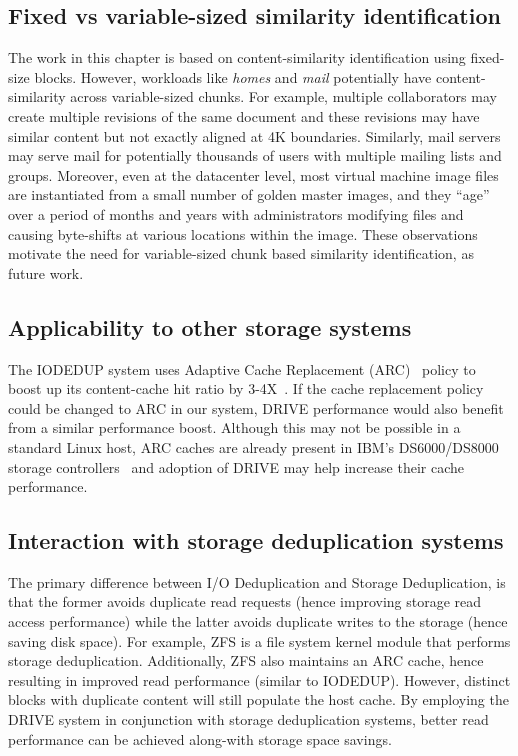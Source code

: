 

\subsection{Fixed vs variable-sized similarity identification}
The work in this chapter is based on content-similarity identification using
fixed-size blocks. However, workloads like \textit{homes} and \textit{mail}
potentially have content-similarity across variable-sized chunks. For
example, multiple collaborators may create multiple revisions of the
same document and these revisions may have similar content but not
exactly aligned at 4K boundaries. Similarly, mail servers may serve mail for
potentially thousands of users with multiple mailing lists and groups.
Moreover, even at the datacenter level, most virtual machine image
files are instantiated from a small number of golden master images\cite{vdn},
and they ``age'' over a period of months and years with 
administrators modifying files and causing byte-shifts
at various locations within the image\cite{similarity}. 
These observations motivate the need for variable-sized chunk based similarity 
identification, as future work.

\subsection{Applicability to other storage systems}
The IODEDUP system uses Adaptive Cache Replacement 
(ARC)~\cite{ARC, outperforming-LRU}
policy to boost up its content-cache hit ratio by 3-4X~\cite{iodedup}.
If the cache replacement policy could be changed to ARC in our 
system, DRIVE performance would also benefit from a similar performance 
boost. Although this may not be possible in a standard Linux host, ARC 
caches are already present in IBM's DS6000/DS8000 storage 
controllers~\cite{wikipedia-arc} and adoption of DRIVE may
help increase their cache performance.

\subsection{Interaction with storage deduplication systems}
The primary difference between I/O Deduplication and Storage 
Deduplication\cite{idedup,dede,zfs}, 
is that the former avoids duplicate read requests 
(hence improving storage read access performance) 
while the latter avoids duplicate writes to the storage
(hence saving disk space). 
For example, ZFS\cite{zfs} 
is a file system kernel module that performs 
storage deduplication. 
Additionally, ZFS also maintains an ARC cache, hence resulting 
in improved read performance (similar to IODEDUP). However, distinct 
blocks with duplicate content will still populate the host cache. By
employing the DRIVE system in conjunction with storage deduplication
systems, better read performance can be achieved along-with 
storage space savings.


